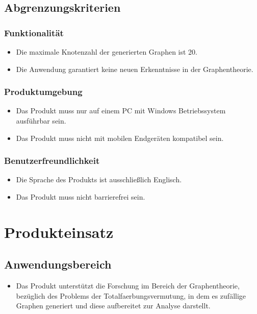 \documentclass[13pt]{scrreprt}
\begin{document}
\section{Abgrenzungskriterien}

\subsection{Funktionalität}
	\begin{itemize}[label={}]
	\item Die maximale Knotenzahl der generierten Graphen ist 20.
	\item Die Anwendung garantiert keine neuen Erkenntnisse in der Graphentheorie.
	\end{itemize}

\subsection{Produktumgebung}
	\begin{itemize}[label={}]
	\item Das Produkt muss nur auf einem PC mit Windows Betriebssystem ausführbar sein.
	\item Das Produkt muss nicht mit mobilen Endgeräten kompatibel sein.
	\end{itemize}

\subsection{Benutzerfreundlichkeit}
	\begin{itemize}[label={}]
	\item Die Sprache des Produkts ist ausschließlich Englisch.
	\item Das Produkt muss nicht barrierefrei sein.
	\end{itemize}



\chapter{Produkteinsatz}

\section{Anwendungsbereich}
	\begin{itemize}[label={}]
	\item{Das Produkt unterstützt die Forschung im Bereich der Graphentheorie, bezüglich des Problems der \Gls{Totalfaerbungsvermutung}, in dem es zufällige Graphen generiert und diese aufbereitet zur Analyse darstellt.}
	\end{itemize}
\end{document}
